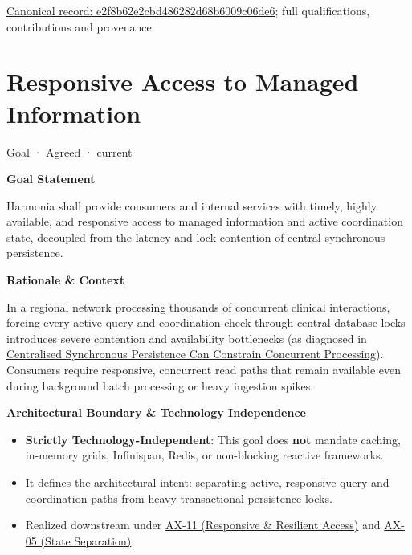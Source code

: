 {\footnotesize \href{../../../../continuum/motivation/goal/e2f8b62e2cbd486282d68b6009c06de6.md}{Canonical record: e2f8b62e2cbd486282d68b6009c06de6}; full qualifications, contributions and provenance.}\par
\section{Responsive Access to Managed Information}

\label{element:c7b8639a922f4d1cb2fcc68933cf7a90}
{\small Goal · Agreed · current}\par

\par\medskip\textbf{Goal Statement}\par


Harmonia shall provide consumers and internal services with timely, highly available, and responsive access to managed information and active coordination state, decoupled from the latency and lock contention of central synchronous persistence.



\par\medskip\textbf{Rationale \& Context}\par


In a regional network processing thousands of concurrent clinical interactions, forcing every active query and coordination check through central database locks introduces severe contention and availability bottlenecks (as diagnosed in \href{\detokenize{../../../../../docs/markdown/01-motivation/drivers-assessments/assessments.md}}{Centralised Synchronous Persistence Can Constrain Concurrent Processing}). Consumers require responsive, concurrent read paths that remain available even during background batch processing or heavy ingestion spikes.



\par\medskip\textbf{Architectural Boundary \& Technology Independence}\par


\begin{itemize}


\item \textbf{Strictly Technology-Independent}: This goal does \textbf{not} mandate caching, in-memory grids, Infinispan, Redis, or non-blocking reactive frameworks.

\item It defines the architectural intent: separating active, responsive query and coordination paths from heavy transactional persistence locks.

\item Realized downstream under \hyperref[element:8a1e995f16954484a78ae1c5c114d546]{AX-11 (Responsive \& Resilient Access)} and \hyperref[element:0412a2084f0145babc4f022c71fea65f]{AX-05 (State Separation)}.

\end{itemize}

